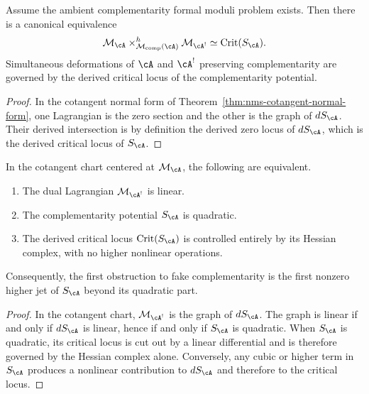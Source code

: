 \begin{theorem}
\label{thm:nms-derived-critical-locus}
Assume the ambient complementarity formal moduli problem exists. Then there is a canonical equivalence
\[
\mathcal M_{\cA}\times^h_{\mathcal M_{\mathrm{comp}}(\cA)}\mathcal M_{\cA^!}
\simeq
\mathrm{Crit}(S_{\cA}).
\]
Simultaneous deformations of $\cA$ and $\cA^!$ preserving complementarity are governed by the derived critical locus of the complementarity potential.
\end{theorem}

\begin{proof}
In the cotangent normal form of Theorem~\ref{thm:nms-cotangent-normal-form}, one Lagrangian is the zero section and the other is the graph of $dS_{\cA}$. Their derived intersection is by definition the derived zero locus of $dS_{\cA}$, which is the derived critical locus of $S_{\cA}$.\qedhere
\end{proof}

\begin{proposition}
\label{prop:nms-fake-complementarity}
In the cotangent chart centered at $\mathcal M_{\cA}$, the following are equivalent.
\begin{enumerate}[label=\textup{(\roman*)}]
\item The dual Lagrangian $\mathcal M_{\cA^!}$ is linear.
\item The complementarity potential $S_{\cA}$ is quadratic.
\item The derived critical locus $\mathrm{Crit}(S_{\cA})$ is controlled entirely by its Hessian complex, with no higher nonlinear operations.
\end{enumerate}
Consequently, the first obstruction to fake complementarity is the first nonzero higher jet of $S_{\cA}$ beyond its quadratic part.
\end{proposition}

\begin{proof}
In the cotangent chart, $\mathcal M_{\cA^!}$ is the graph of $dS_{\cA}$. The graph is linear if and only if $dS_{\cA}$ is linear, hence if and only if $S_{\cA}$ is quadratic. When $S_{\cA}$ is quadratic, its critical locus is cut out by a linear differential and is therefore governed by the Hessian complex alone. Conversely, any cubic or higher term in $S_{\cA}$ produces a nonlinear contribution to $dS_{\cA}$ and therefore to the critical locus.\qedhere
\end{proof}

